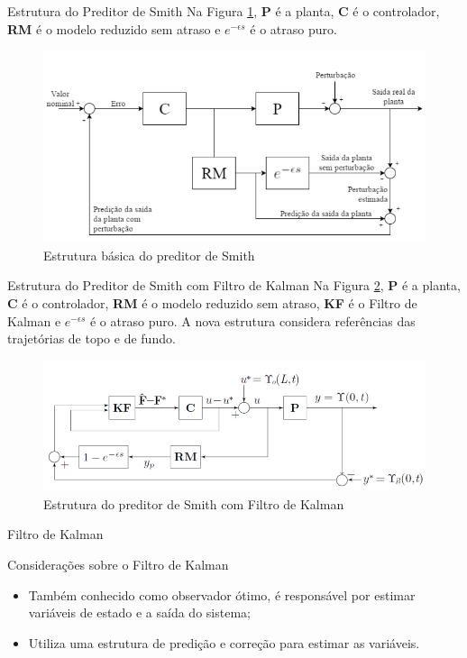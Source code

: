 \documentclass[10pt]{beamer}
\begin{document}
\begin{frame}[fragile]{Estrutura do Preditor de Smith}
Na Figura \ref{smithStruct1}, \textbf{P} é a planta, \textbf{C} é o controlador, \textbf{RM} é o modelo reduzido sem atraso e $e^{-\epsilon s}$ é o atraso puro.
\begin{figure}[!ht]
\centering
\includegraphics[width=.75\linewidth]{figures/smith/smith1}
\caption{Estrutura básica do preditor de Smith \cite{rafaelMestrado}}
\label{smithStruct1}
\end{figure}
\end{frame}

\begin{frame}[fragile]{Estrutura do Preditor de Smith com Filtro de Kalman}
Na Figura \ref{smithStruct2}, \textbf{P} é a planta, \textbf{C} é o controlador, \textbf{RM} é o modelo reduzido sem atraso, \textbf{KF} é o Filtro de Kalman e $e^{-\epsilon s}$ é o atraso puro. A nova estrutura considera referências das trajetórias de topo e de fundo.
\begin{figure}[!ht]
\centering
\includegraphics[width=.85\linewidth]{figures/smith/smith2}
\caption{Estrutura do preditor de Smith com Filtro de Kalman \cite{rafaelMestrado}}
\label{smithStruct2}
\end{figure}
\end{frame}

\begin{frame}[fragile]{Filtro de Kalman}
\begin{block}{Considerações sobre o Filtro de Kalman}
\begin{itemize}
\item Também conhecido como observador ótimo, é responsável por estimar variáveis de estado e a saída do sistema;
\item Utiliza uma estrutura de predição e correção para estimar as variáveis.
\end{itemize}
\end{block}
\end{frame}
\end{document}
